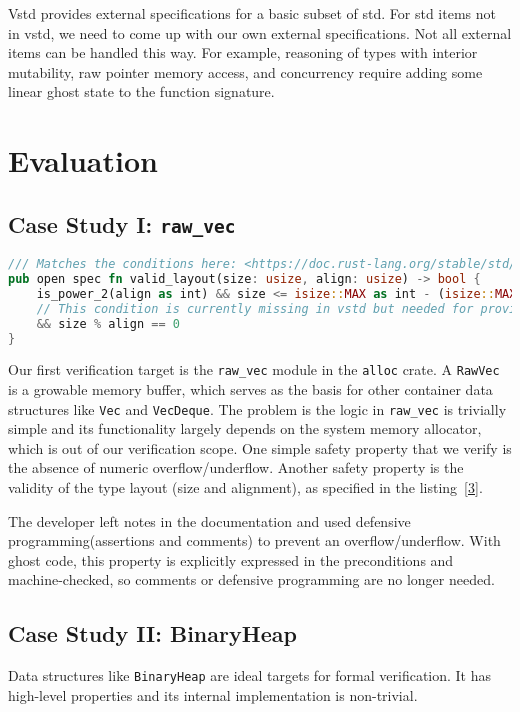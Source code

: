 \documentclass[conference]{IEEEtran}
\begin{document}
Vstd provides external specifications for a basic subset of std. For std items not in vstd, we need to come up with our own external specifications. Not all external items can be handled this way. For example, reasoning of types with interior mutability, raw pointer memory access, and concurrency require adding some linear ghost state to the function signature.  

\section{Evaluation}
\subsection{Case Study I: \texttt{raw\_vec}}
\begin{lstlisting}[language=Rust,style=colouredRust, caption={The formal specification of a valid layout in vstd}, label = {3}]
/// Matches the conditions here: <https://doc.rust-lang.org/stable/std/alloc/struct.Layout.html>
pub open spec fn valid_layout(size: usize, align: usize) -> bool {
    is_power_2(align as int) && size <= isize::MAX as int - (isize::MAX as int % align as int)
    // This condition is currently missing in vstd but needed for proving pointer arithmics. See <https://github.com/verus-lang/verus/issues/1570>.
    && size % align == 0 
}
\end{lstlisting}
Our first verification target is the \texttt{raw\_vec} module in the \texttt{alloc} crate. A \texttt{RawVec} is a growable memory buffer, which serves as the basis for other container data structures like \texttt{Vec} and \texttt{VecDeque}. The problem is the logic in \texttt{raw\_vec} is trivially simple and its functionality largely depends on the system memory allocator, which is out of our verification scope. One simple safety property that we verify is the absence of numeric overflow/underflow. Another safety property is the validity of the type layout (size and alignment), as specified in the listing~\ref{3}. 

The developer left notes in the documentation and used defensive programming(assertions and comments) to prevent an overflow/underflow. With ghost code, this property is explicitly expressed in the preconditions and machine-checked, so comments or defensive programming are no longer needed. 

\subsection{Case Study II: BinaryHeap}
Data structures like \texttt{BinaryHeap} are ideal targets for formal verification. It has high-level properties and its internal implementation is non-trivial. 
\end{document}
